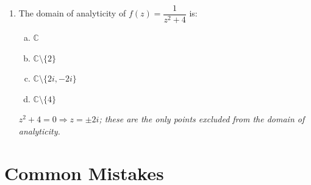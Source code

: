 \documentclass[12pt,a4paper]{article}
\begin{document}
\begin{enumerate}
  \item The domain of analyticity of $f(z) = \dfrac{1}{z^{2}+4}$ is:
  \begin{enumerate}[(a)]
    \item $\mathbb{C}$
    \item $\mathbb{C}\setminus\{2\}$
    \item \textbf{$\mathbb{C}\setminus\{2i, -2i\}$}
    \item $\mathbb{C}\setminus\{4\}$
  \end{enumerate}
  \textit{$z^{2}+4 = 0 \Rightarrow z = \pm 2i$; these are the only points excluded from the domain of analyticity.}

\end{enumerate}

\section{Common Mistakes}
\end{document}
